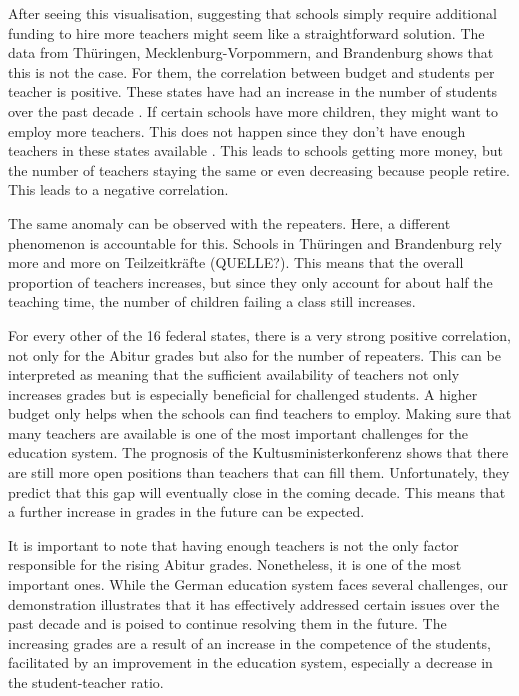 After seeing this visualisation, suggesting that schools simply require additional funding to hire more teachers might seem like a straightforward solution. The data from Thüringen, Mecklenburg-Vorpommern, and Brandenburg shows that this is not the case. For them, the correlation between budget and students per teacher is positive. These states have had an increase in the number of students over the past decade  \cite{thuringer_ministerium_fur_bildung_jugend_und_sport_verteilung_2023,ministerium_fur_bildung_jugend_und_sport_zahlen_2023,statistisches_amt_mecklenburg-vorpommern_statistik_nodate}. If certain schools have more children, they might want to employ more teachers. This does not happen since they don't have enough teachers in these states available \cite{kultusminister_konferenz_lehrkrafteeinstellungsbedarf_2023}. This leads to schools getting more money, but the number of teachers staying the same or even decreasing because people retire. This leads to a negative correlation.

The same anomaly can be observed with the repeaters. Here, a different phenomenon is accountable for this. Schools in Thüringen and Brandenburg rely more and more on Teilzeitkräfte (QUELLE?). This means that the overall proportion of teachers increases, but since they only account for about half the teaching time, the number of children failing a class still increases.

For every other of the 16 federal states, there is a very strong positive correlation, not only for the Abitur grades but also for the number of repeaters. This can be interpreted as meaning that the sufficient availability of teachers not only increases grades but is especially beneficial for challenged students. A higher budget only helps when the schools can find teachers to employ. Making sure that many teachers are available is one of the most important challenges for the education system. The prognosis of the Kultusministerkonferenz \cite{kultusminister_konferenz_lehrkrafteeinstellungsbedarf_2023} shows that there are still more open positions than teachers that can fill them. Unfortunately, they predict that this gap will eventually close in the coming decade. This means that a further increase in grades in the future can be expected.

It is important to note that having enough teachers is not the only factor responsible for the rising Abitur grades. Nonetheless, it is one of the most important ones. While the German education system faces several challenges, our demonstration illustrates that it has effectively addressed certain issues over the past decade and is poised to continue resolving them in the future. The increasing grades are a result of an increase in the competence of the students, facilitated by an improvement in the education system, especially a decrease in the student-teacher ratio.
